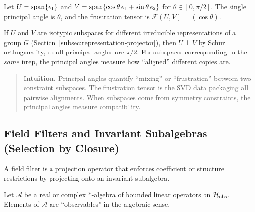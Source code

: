 \begin{example}
\label{ex:lines-r2}
Let $U = \mathrm{span}\{e_1\}$ and $V = \mathrm{span}\{\cos\theta\, e_1 + \sin\theta\, e_2\}$ for $\theta \in [0, \pi/2]$.
The single principal angle is $\theta$, and the frustration tensor is $\mathcal{F}(U,V) = (\cos\theta)$.
\end{example}

\begin{remark}
If $U$ and $V$ are isotypic subspaces for different irreducible representations of a group $G$ (Section~\ref{subsec:representation-projector}), then $U \perp V$ by Schur orthogonality, so all principal angles are $\pi/2$.
For subspaces corresponding to the \emph{same} irrep, the principal angles measure how ``aligned'' different copies are.
\end{remark}

\begin{quote}\small
\textbf{Intuition.}
Principal angles quantify ``mixing'' or ``frustration'' between two constraint subspaces.
The frustration tensor is the SVD data packaging all pairwise alignments.
When subspaces come from symmetry constraints, the principal angles measure compatibility.
\end{quote}

\subsection{Field Filters and Invariant Subalgebras (Selection by Closure)}
\label{subsec:field-filter}

A field filter is a projection operator that enforces coefficient or structure restrictions by projecting onto an invariant subalgebra.

\begin{definition}
\label{def:observable-algebra}
Let $\mathcal{A}$ be a real or complex $*$-algebra of bounded linear operators on $\mathcal{H}_{\mathrm{obs}}$.
Elements of $\mathcal{A}$ are ``observables'' in the algebraic sense.
\end{definition}

